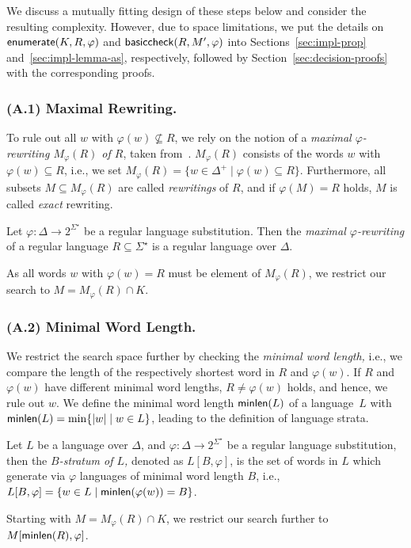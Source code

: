 \documentclass[envcountsame]{llncs}
\newcommand{\basiccheck}{\ensuremath{{\sf basiccheck}}\xspace}
\newcommand{\setenumeration}{\ensuremath{{\sf enumerate}}\xspace}
\newcommand{\minlength}{\ensuremath{{\sf minlen}}\xspace}
\begin{document}
We discuss a mutually fitting design of these steps below and
consider the resulting complexity. 
However, due to space limitations, we put the details on
$\setenumeration(K,R,\varphi)$ and $\basiccheck(R,M',\varphi)$ into
Sections~\ref{sec:impl-prop} and~\ref{sec:impl-lemma-as},
respectively, followed by Section~\ref{sec:decision-proofs} with the
corresponding proofs. 



\subsubsection{(A.1) Maximal Rewriting.}
\label{sec:maximal-rewriting}
To rule out all $w$ with $\varphi(w)\not\subseteq R$, we rely on the
notion of a \emph{maximal $\varphi$-rewriting $M_\varphi(R)$ of $R$},
taken from~\cite{rewriting}.
$M_\varphi(R)$ consists of the words $w$ with $\varphi(w)\subseteq R$,
i.e., we set $M_\varphi(R) = \{ w \in \Delta^+ \mid \varphi(w)
\subseteq R \}$.
Furthermore, all subsets $M\subseteq M_\varphi(R)$ are called
\emph{rewritings} of $R$, and if $\varphi(M) = R$ holds, $M$ is called
\emph{exact} rewriting.
\begin{proposition}
	\label{def:rewriting}
	Let $\varphi : \Delta \rightarrow 2^{\Sigma^\star}$ be a regular
    language substitution.
Then the \emph{maximal $\varphi$-rewriting} of a regular language
    $R \subseteq \Sigma^\star$ is a regular language over $\Delta$.
\end{proposition}
As all words $w$ with $\varphi(w)=R$ must be element of
$M_\varphi(R)$, we restrict our search to $M=M_\varphi(R)\cap K$.



\subsubsection{(A.2) Minimal Word Length.}
We restrict the search space further by checking the \emph{minimal
  word length,} i.e., we compare the length of the respectively
shortest word in $R$ and $\varphi(w)$. If $R$ and $\varphi(w)$ have
different minimal word lengths, $R\neq\varphi(w)$ holds, and hence, we
rule out $w$.
We define the minimal word length $\minlength(L)$ of a language~$L$
with $\minlength(L)=\min\{|w| \mid w\in L\}$, leading to the
definition of language strata.
\begin{definition}
  \label{def:stratum}
  Let $L$ be a language over $\Delta$, and $\varphi: \Delta\rightarrow
  2^{\Sigma^\star}$ be a regular language substitution, then the
  \emph{$B$-stratum of $L$,} denoted as $L[B, \varphi]$, is the set of
  words in $L$ which generate via $\varphi$ languages of minimal word
  length $B$, i.e., $L[B, \varphi]=\{w\in L \mid
  \minlength(\varphi(w))=B\}$.
\end{definition}
Starting with $M=M_\varphi(R)\cap K$, we restrict our search further
to $M[\minlength(R), \varphi]$.
\end{document}
